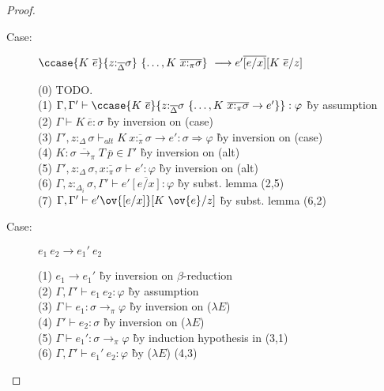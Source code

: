 \begin{proof}
\begin{description}
\item[Case:]
    $\ccase{K~\overline{e}}{z{:}_{\overline{\Delta}}\sigma}~\{\dots,K~\overline{x{:}_\pi\sigma}\}\ \longrightarrow e'\overline{[e/x]}[K~\overline{e}/z]$
\begin{tabbing}
(0) TODO.\\
(1) $\Gamma,\Gamma' \vdash \ccase{K~\overline{e}}{z{:}_{\overline{\Delta}}\sigma~\{\dots,K~\overline{x{:}_\pi\sigma}\to e'\}} : \varphi$ \` by assumption \\
(2) $\Gamma \vdash K~\overline{e} : \sigma$ \` by inversion on (case) \\
(3) $\Gamma', z{:}_\Delta\sigma \vdash_{alt} K~\overline{x{:}_\pi\sigma} \to e' : \sigma \Longrightarrow \varphi$ \` by inversion on (case) \\
(4) $K : \overline{\sigma \to_\pi} T~\overline{p} \in \Gamma'$ \` by inversion on (alt) \\
(5) $\Gamma',z{:}_\Delta\sigma,\overline{x{:}_\pi\sigma} \vdash e' : \varphi$ \` by inversion on (alt) \\
(6) $\Gamma, z{:}_{\Delta_i}\sigma, \Gamma' \vdash e'\overline{[e/x]} : \varphi$ \` by subst. lemma (2,5) \\
(7) $\Gamma, \Gamma' \vdash e'\ov{[e/x]}[K~\ov{e}/z]$ \` by subst. lemma (6,2) \\
\end{tabbing}

\item[Case:] $e_1~e_2 \longrightarrow e_1'~e_2$
\begin{tabbing}
(1) $e_1 \longrightarrow e_1'$ \` by inversion on $\beta$-reduction \\
(2) $\Gamma,\Gamma' \vdash e_1~e_2 : \varphi$ \` by assumption \\
(3) $\Gamma \vdash e_1 : \sigma \to_\pi \varphi$ \` by inversion on ($\lambda E$) \\
(4) $\Gamma' \vdash e_2 : \sigma$ \` by inversion on ($\lambda E$) \\
(5) $\Gamma \vdash e_1' : \sigma \to_\pi \varphi$ \` by induction hypothesis in (3,1) \\
(6) $\Gamma, \Gamma' \vdash e_1'~e_2 : \varphi$ \` by ($\lambda E$) (4,3) \\
\end{tabbing}


\end{description}
\end{proof}
